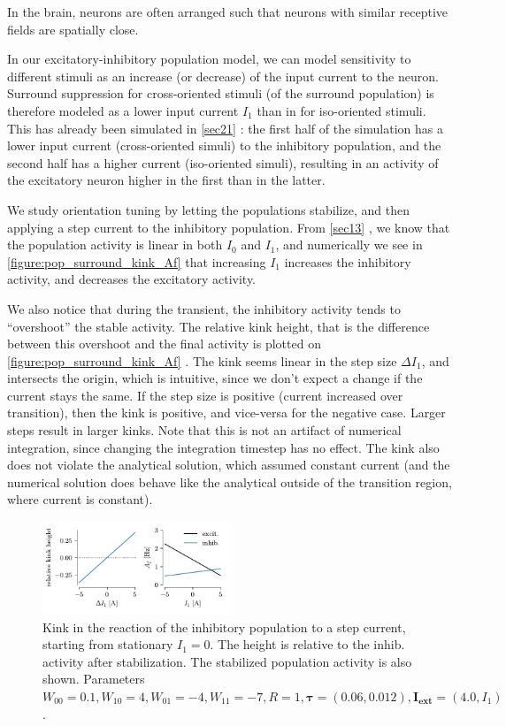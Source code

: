 \documentclass[10pt,conference,compsocconf,a4paper]{IEEEtran}
\renewcommand{\vec}[1]{\boldsymbol{#1}}
\newcommand*{\shortautoref}[1]{%
	\begingroup
	\def\equationautorefname{\textsc{Eq.}}%
	\def\tableautorefname{\textsc{Tab.}}%
	\def\figureautorefname{\textsc{Fig.}}%
	\autoref{#1}%
	\endgroup
}
\begin{document}
		In the brain, neurons are often arranged such that neurons with similar receptive fields are spatially close.

		In our excitatory-inhibitory population model, we can model sensitivity to different stimuli as an increase (or decrease) of the input current to the neuron. Surround suppression for cross-oriented stimuli (of the surround population) is therefore modeled as a lower input current $I_1$ than in for iso-oriented stimuli. This has already been simulated in \shortautoref{sec21} : the first half of the simulation has a lower input current (cross-oriented simuli) to the inhibitory population, and the second half has a higher current (iso-oriented simuli), resulting in an activity of the excitatory neuron higher in the first than in the latter.

		We study orientation tuning by letting the populations stabilize, and then applying a step current to the inhibitory population. From \shortautoref{sec13}, we know that the population activity is linear in both $I_0$ and $I_1$, and numerically we see in \shortautoref{figure:pop_surround_kink_Af} that increasing $I_1$ increases the inhibitory activity, and decreases the excitatory activity.

		We also notice that during the transient, the inhibitory activity tends to ``overshoot'' the stable activity. The relative kink height, that is the difference between this overshoot and the final activity is plotted on \shortautoref{figure:pop_surround_kink_Af}. The kink seems linear in the step size $\Delta I_1$, and intersects the origin, which is intuitive, since we don't expect a change if the current stays the same. If the step size is positive (current increased over transition), then the kink is positive, and vice-versa for the negative case. Larger steps result in larger kinks. Note that this is not an artifact of numerical integration, since changing the integration timestep has no effect. The kink also does not violate the analytical solution, which assumed constant current (and the numerical solution does behave like the analytical outside of the transition region, where current is constant).

		\begin{figure}
			\centering
			\includegraphics[width=0.5\textwidth]{figures/pop_surround_kink_Af.pdf}
			\caption{Kink in the reaction of the inhibitory population to a step current, starting from stationary $I_1 = 0$. The height is relative to the inhib. activity after stabilization. The stabilized population activity is also shown. Parameters $W_{00} = 0.1, W_{10} = 4, W_{01} = -4, W_{11} = -7, R = 1, \vec \tau = (0.06, 0.012), \vec{I_{\text{ext}}} = (4.0, I_1)$.}
			\label{figure:pop_surround_kink_Af}
		\end{figure}
\end{document}
